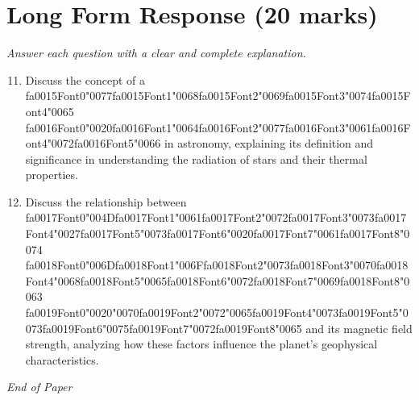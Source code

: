 \documentclass[12pt]{article}
\begin{document}
\section*{Long Form Response (20 marks)}
\textit{Answer each question with a clear and complete explanation.}
\begin{enumerate}[label=\arabic*.]
\setcounter{enumi}{10}
\item Discuss the concept of a {\csname fa0015Font0\endcsname\char"0077}{\csname fa0015Font1\endcsname\char"0068}{\csname fa0015Font2\endcsname\char"0069}{\csname fa0015Font3\endcsname\char"0074}{\csname fa0015Font4\endcsname\char"0065} {\csname fa0016Font0\endcsname\char"0020}{\csname fa0016Font1\endcsname\char"0064}{\csname fa0016Font2\endcsname\char"0077}{\csname fa0016Font3\endcsname\char"0061}{\csname fa0016Font4\endcsname\char"0072}{\csname fa0016Font5\endcsname\char"0066} in astronomy, explaining its definition and
significance in understanding the radiation of stars and their thermal properties.
\item Discuss the relationship between {\csname fa0017Font0\endcsname\char"004D}{\csname fa0017Font1\endcsname\char"0061}{\csname fa0017Font2\endcsname\char"0072}{\csname fa0017Font3\endcsname\char"0073}{\csname fa0017Font4\endcsname\char"0027}{\csname fa0017Font5\endcsname\char"0073}{\csname fa0017Font6\endcsname\char"0020}{\csname fa0017Font7\endcsname\char"0061}{\csname fa0017Font8\endcsname\char"0074} {\csname fa0018Font0\endcsname\char"006D}{\csname fa0018Font1\endcsname\char"006F}{\csname fa0018Font2\endcsname\char"0073}{\csname fa0018Font3\endcsname\char"0070}{\csname fa0018Font4\endcsname\char"0068}{\csname fa0018Font5\endcsname\char"0065}{\csname fa0018Font6\endcsname\char"0072}{\csname fa0018Font7\endcsname\char"0069}{\csname fa0018Font8\endcsname\char"0063} {\csname fa0019Font0\endcsname\char"0020}{\char"0070}{\csname fa0019Font2\endcsname\char"0072}{\char"0065}{\csname fa0019Font4\endcsname\char"0073}{\csname fa0019Font5\endcsname\char"0073}{\csname fa0019Font6\endcsname\char"0075}{\csname fa0019Font7\endcsname\char"0072}{\csname fa0019Font8\endcsname\char"0065} and its magnetic field strength,
analyzing how these factors influence the planet's geophysical characteristics.
\end{enumerate}

\vfill
\noindent\textit{End of Paper}
\end{document}
